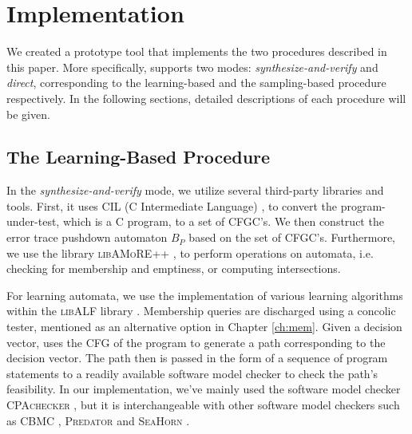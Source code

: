 \chapter{Implementation}\label{ch:implementation}

We created a prototype tool \PACMAN that implements the two procedures described in this paper. More specifically, \PACMAN supports two modes: \emph{synthesize-and-verify} and \emph{direct}, corresponding to the learning-based and the sampling-based procedure respectively. In the following sections, detailed descriptions of each procedure will be given.

\section{The Learning-Based Procedure}\label{sec:impl_learning}

In the \emph{synthesize-and-verify} mode, we utilize several third-party libraries and tools. First, it uses CIL (C Intermediate Language) \cite{NeculaMRW02}, \cite{cil} to convert the program-under-test, which is a C program, to a set of CFGC's. We then construct the error trace pushdown automaton $B_P$ based on the set of CFGC's. Furthermore, we use the library \textsc{libAMoRE++} \cite{MatzMPTV95}, \cite{BolligKKLNP10} \cite{libamore++} to perform operations on automata, i.e. checking for membership and emptiness, or computing intersections. 

For learning automata, we use the implementation of various learning algorithms within the \textsc{libALF} library \cite{BolligKKLNP10} \cite{libalf}. Membership queries are discharged using a concolic tester, mentioned as an alternative option in Chapter \ref{ch:mem}. Given a decision vector, \PACMAN uses the CFG of the program to generate a path corresponding to the decision vector. The path then is passed in the form of a sequence of program statements to a readily available software model checker to check the path's feasibility. In our implementation, we've mainly used the software model checker \textsc{CPAchecker} \cite{BeyerK11} \cite{cpachecker}, but it is interchangeable with other software model checkers such as CBMC \cite{ClarkeKL04} \cite{cbmc}, \textsc{Predator} \cite{DudkaPV11} \cite{predator} and \textsc{SeaHorn} \cite{GurfinkelKKN15} \cite{seahorn}.

